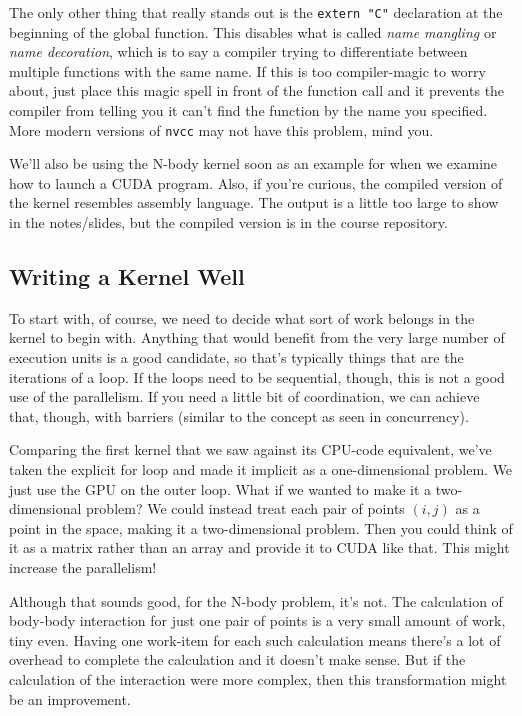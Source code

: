 \documentclass[a4paper]{report}
\begin{document}
The only other thing that really stands out is the \texttt{extern "C"} declaration at the beginning of the global function. This disables what is called \textit{name mangling} or \textit{name decoration}, which is to say a compiler trying to differentiate between multiple functions with the same name. If this is too compiler-magic to worry about, just place this magic spell in front of the function call and it prevents the compiler from telling you it can't find the function by the name you specified. More modern versions of \texttt{nvcc} may not have this problem, mind you.

We'll also be using the N-body kernel soon as an example for when we examine how to launch a CUDA program. Also, if you're curious, the compiled version of the kernel resembles assembly language. The output is a little too large to show in the notes/slides, but the compiled version is in the course repository.

\subsection*{Writing a Kernel Well}

To start with, of course, we need to decide what sort of work belongs in the kernel to begin with. Anything that would benefit from the very large number of execution units is a good candidate, so that's typically things that are the iterations of a loop. If the loops need to be sequential, though, this is not a good use of the parallelism. If you need a little bit of coordination, we can achieve that, though, with barriers (similar to the concept as seen in concurrency). 

Comparing the first kernel that we saw against its CPU-code equivalent, we've taken the explicit for loop and made it implicit as a one-dimensional problem. We just use the GPU on the outer loop. What if we wanted to make it a two-dimensional problem? We could instead treat each pair of points $(i, j)$ as a point in the space, making it a two-dimensional problem. Then you could think of it as a matrix rather than an array and provide it to CUDA like that. This might increase the parallelism! 

Although that sounds good, for the N-body problem, it's not. The calculation of body-body interaction for just one pair of points is a very small amount of work, tiny even. Having one work-item for each such calculation means there's a lot of overhead to complete the calculation and it doesn't make sense. But if the calculation of the interaction were more complex, then this transformation might be an improvement.
\end{document}
